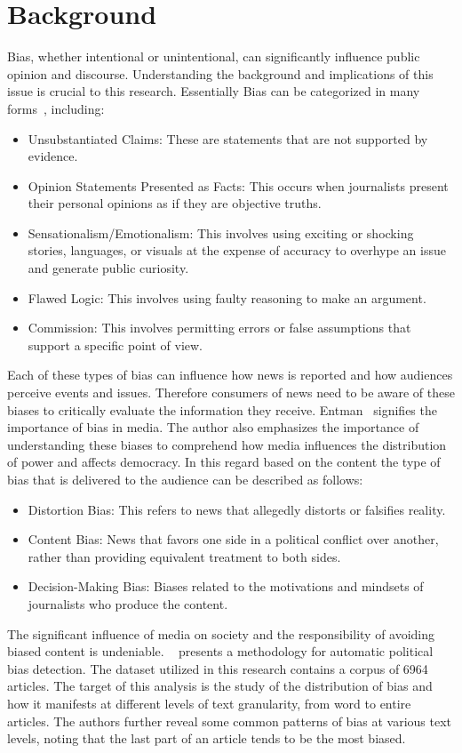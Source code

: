 \documentclass[11pt,a4paper]{article}
\begin{document}
\section{Background}
Bias, whether intentional or unintentional, can significantly influence public opinion and discourse. Understanding the background and implications of this issue is crucial to this research. 
Essentially Bias can be categorized in many forms~\cite{mastrine_2019_how}, including:
\begin{itemize}
    \item Unsubstantiated Claims: These are statements that are not supported by evidence.
    \item Opinion Statements Presented as Facts: This occurs when journalists present their personal opinions as if they are objective truths.
    \item Sensationalism/Emotionalism: This involves using exciting or shocking stories, languages, or visuals at the expense of accuracy to overhype an issue and generate public curiosity.
    \item Flawed Logic: This involves using faulty reasoning to make an argument.
    \item Commission: This involves permitting errors or false assumptions that support a specific point of view.
\end{itemize}
Each of these types of bias can influence how news is reported and how audiences perceive events and issues. Therefore consumers of news need to be aware of these biases to critically evaluate the information they receive. Entman~\cite{entman_2007_framing} signifies the importance of bias in media. The author also emphasizes the importance of understanding these biases to comprehend how media influences the distribution of power and affects democracy. In this regard based on the content the type of bias that is delivered to the audience can be described as follows:
\begin{itemize}
    \item Distortion Bias: This refers to news that allegedly distorts or falsifies reality.
    \item Content Bias: News that favors one side in a political conflict over another, rather than providing equivalent treatment to both sides.
    \item Decision-Making Bias: Biases related to the motivations and mindsets of journalists who produce the content.
\end{itemize}
The significant influence of media on society and the responsibility of avoiding biased content is undeniable. ~\cite{chen_2020_analyzing} presents a methodology for automatic political bias detection. The dataset utilized in this research contains a corpus of 6964 articles. The target of this analysis is the study of the distribution of bias and how it manifests at different levels of text granularity, from word to entire articles. The authors further reveal some common patterns of bias at various text levels, noting that the last part of an article tends to be the most biased.\\
\end{document}
